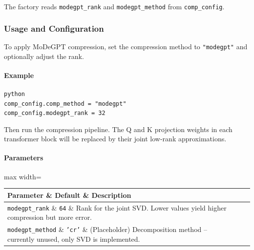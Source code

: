 The factory reads \texttt{modegpt\_rank} and \texttt{modegpt\_method} from \texttt{comp\_config}.


\subsubsection*{Usage and Configuration}

To apply MoDeGPT compression, set the compression method to \texttt{"modegpt"} and optionally adjust the rank.

\paragraph{Example}

\vspace{0.5em}
\begin{mdframed}[backgroundcolor=codebg, linecolor=codeframe, linewidth=1pt, roundcorner=4pt, innerleftmargin=2pt, innerrightmargin=5pt, innertopmargin=5pt, innerbottommargin=5pt]
\begin{lstlisting}
python
comp_config.comp_method = "modegpt"
comp_config.modegpt_rank = 32
\end{lstlisting}
\end{mdframed}
\vspace{0.5em}

Then run the compression pipeline. The Q and K projection weights in each transformer block will be replaced by their joint low-rank approximations.

\paragraph{Parameters}

\begin{center}
\begin{adjustbox}{max width=\columnwidth}
\renewcommand{\arraystretch}{1.2}
\begin{tabular}{lll}
\toprule
Parameter \& Default \& Description \\
\midrule
\texttt{modegpt\_rank} \& \texttt{64} \& Rank for the joint SVD. Lower values yield higher compression but more error. \\
\texttt{modegpt\_method} \& \texttt{'cr'} \& (Placeholder) Decomposition method -- currently unused, only SVD is implemented. \\

\bottomrule
\end{tabular}
\end{adjustbox}
\end{center}

